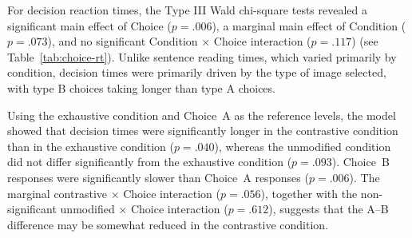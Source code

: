 \documentclass[a4paper, ruler]{CUP-JNL-LIN}%
\begin{document}
For decision reaction times, the Type III Wald chi-square tests revealed a significant main effect of Choice ($p=.006$), a marginal main effect of Condition ($p=.073$), and no significant Condition $\times$ Choice interaction ($p=.117$) (see Table~\ref{tab:choice-rt}). Unlike sentence reading times, which varied primarily by condition, decision times were primarily driven by the type of image selected, with type B choices taking longer than type A choices.


Using the exhaustive condition and Choice~A as the reference levels, the model showed that decision times were significantly longer in the contrastive condition than in the exhaustive condition ($p=.040$), whereas the unmodified condition did not differ significantly from the exhaustive condition ($p=.093$). Choice~B responses were significantly slower than Choice~A responses ($p=.006$). The marginal contrastive $\times$ Choice interaction ($p=.056$), together with the non-significant unmodified $\times$ Choice interaction ($p=.612$), suggests that the A--B difference may be somewhat reduced in the contrastive condition.



\end{document}
